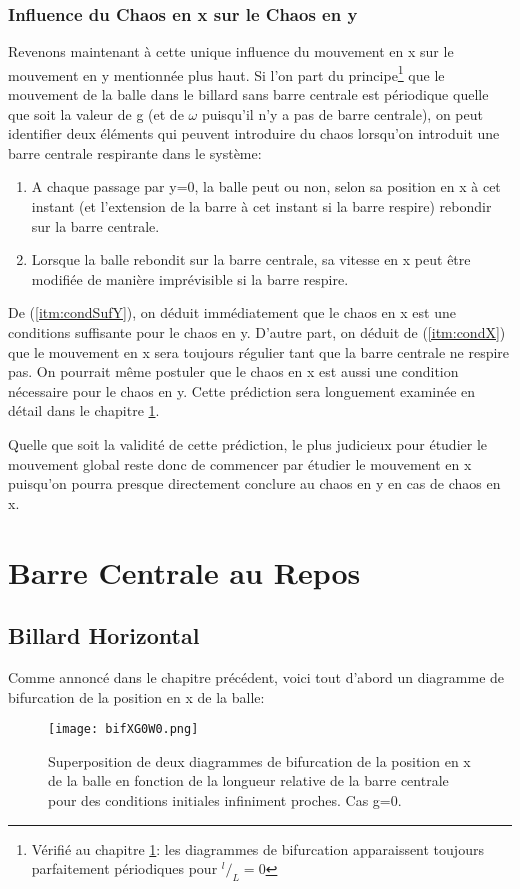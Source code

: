 \documentclass[a4paper]{report}
\begin{document}
\subsection{Influence du Chaos en x sur le Chaos en y}
\label{sec:chaosXY}
Revenons maintenant à cette unique influence du mouvement en x sur le mouvement en y mentionnée plus haut. Si l'on part du principe\footnote{Vérifié au chapitre \ref{chap:barRepos}: les diagrammes de bifurcation apparaissent toujours parfaitement périodiques pour \(^{l}/_L=0\)} que le mouvement de la balle dans le billard sans barre centrale est périodique quelle que soit la valeur de g (et de \(\omega\) puisqu'il n'y a pas de barre centrale), on peut identifier deux éléments qui peuvent introduire du chaos lorsqu'on introduit une barre centrale respirante dans le système:
\begin{enumerate}
 \item A chaque passage par y=0, la balle peut ou non, selon sa position en x à cet instant (et l'extension de la barre à cet instant si la barre respire) rebondir sur la barre centrale.\label{itm:condSufY}
 \item Lorsque la balle rebondit sur la barre centrale, sa vitesse en x peut être modifiée de manière imprévisible si la barre respire.\label{itm:condX}
\end{enumerate}

De (\ref{itm:condSufY}), on déduit immédiatement que le chaos en x est une conditions suffisante pour le chaos en y. D'autre part, on déduit de (\ref{itm:condX}) que le mouvement en x sera toujours régulier tant que la barre centrale ne respire pas. On pourrait même postuler que le chaos en x est aussi une condition nécessaire pour le chaos en y. Cette prédiction sera longuement examinée en détail dans le chapitre \ref{chap:barRepos}.

Quelle que soit la validité de cette prédiction, le plus judicieux pour étudier le mouvement global reste donc de commencer par étudier le mouvement en x puisqu'on pourra presque directement conclure au chaos en y en cas de chaos en x.

\chapter{Barre Centrale au Repos}
\label{chap:barRepos}

\section{Billard Horizontal}
\label{sec:xRegHor}
Comme annoncé dans le chapitre précédent, voici tout d'abord un diagramme de bifurcation de la position en x de la balle:
\begin{figure}[h!]
   \texttt{[image: bifXG0W0.png]}
      \caption[Diagramme de bifurcation en x: g=0 ]{Superposition de deux diagrammes de bifurcation de la position en x de la balle en fonction de la longueur relative de la barre centrale pour des conditions initiales infiniment proches. Cas g=0.}
\end{figure}
\end{document}
